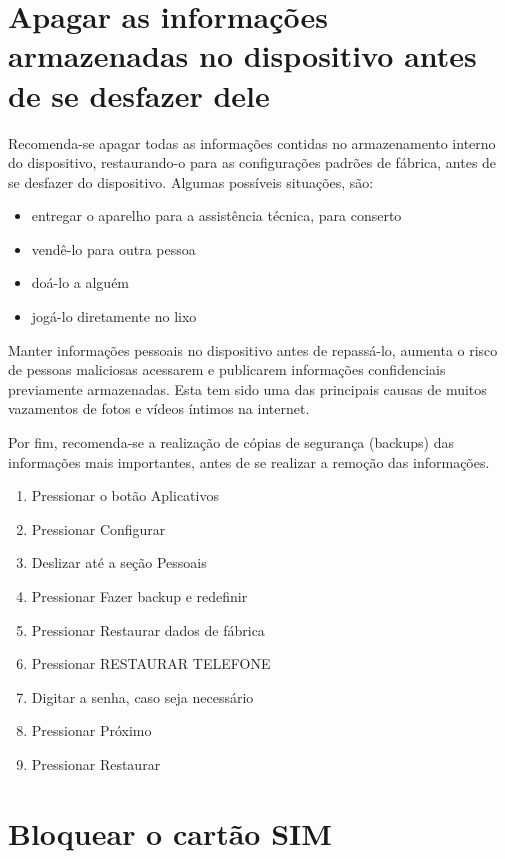 \section{Apagar as informa\c c\~oes armazenadas no dispositivo antes de se desfazer dele}

Recomenda-se apagar todas as informa\c c\~oes contidas no armazenamento interno do dispositivo, restaurando-o para as configura\c c\~oes padr\~oes de f\'abrica, antes de se desfazer do dispositivo. Algumas poss\'iveis situa\c c\~oes, s\~ao:

\begin{itemize}
\item entregar o aparelho para a assist\^encia t\'ecnica, para conserto
\item vend\^e-lo para outra pessoa
\item do\'a-lo a algu\'em
\item jog\'a-lo diretamente no lixo
\end{itemize}

Manter informa\c c\~oes pessoais no dispositivo antes de repass\'a-lo, aumenta o risco de pessoas maliciosas acessarem e publicarem informa\c c\~oes confidenciais previamente armazenadas. Esta tem sido uma das principais causas de muitos vazamentos de fotos e v\'ideos \'intimos na internet. 

Por fim, recomenda-se a realiza\c c\~ao de c\'opias de seguran\c ca (backups) das informa\c c\~oes mais importantes, antes de se realizar a remo\c c\~ao das informa\c c\~oes.

\begin{enumerate}
\item Pressionar o bot\~ao Aplicativos
\item Pressionar Configurar
\item Deslizar at\'e a se\c c\~ao Pessoais
\item Pressionar Fazer backup e redefinir
\item Pressionar Restaurar dados de f\'abrica
\item Pressionar RESTAURAR TELEFONE
\item Digitar a senha, caso seja necess\'ario
\item Pressionar Pr\'oximo
\item Pressionar Restaurar
\end{enumerate}

\section{Bloquear o cart\~ao SIM}

